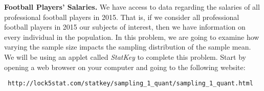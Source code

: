 \item \textbf{Football Players' Salaries.}  We have access to data regarding the salaries of all professional football players in 2015.  That is, if we consider all professional football players in 2015 our subjects of interest, then we have information on every individual in the population.  In this problem, we are going to examine how varying the sample size impacts the sampling distribution of the sample mean.  We will be using an applet called \textit{StatKey} to complete this problem.  Start by opening a web browser on your computer and going to the following website:
\begin{center}
\begin{verbatim} http://lock5stat.com/statkey/sampling_1_quant/sampling_1_quant.html \end{verbatim}
\end{center}
    
